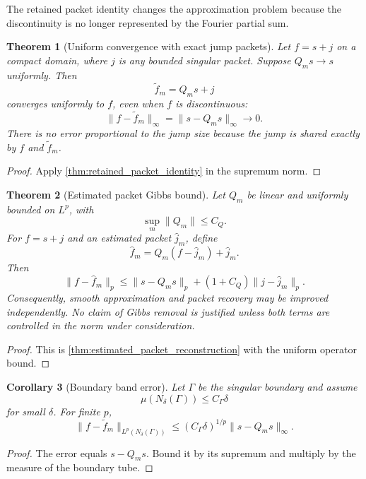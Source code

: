 \documentclass[11pt,a4paper]{article}
\newtheorem{theorem}{Theorem}[section]
\newtheorem{corollary}[theorem]{Corollary}
\theoremstyle{definition}
\theoremstyle{remark}
\begin{document}
The retained packet identity changes the approximation problem because the discontinuity is no longer represented by the Fourier partial sum.

\begin{theorem}[Uniform convergence with exact jump packets]\label{thm:uniform_packet_convergence}
Let \(f=s+j\) on a compact domain, where \(j\) is any bounded singular packet. Suppose \(Q_ms\to s\) uniformly. Then
\[
\widetilde f_m=Q_ms+j
\]
converges uniformly to \(f\), even when \(f\) is discontinuous:
\[
\|f-\widetilde f_m\|_\infty
=
\|s-Q_ms\|_\infty
\longrightarrow0.
\]
There is no error proportional to the jump size because the jump is shared exactly by \(f\) and \(\widetilde f_m\).
\end{theorem}

\begin{proof}
Apply \cref{thm:retained_packet_identity} in the supremum norm.
\end{proof}

\begin{theorem}[Estimated packet Gibbs bound]\label{thm:estimated_packet_gibbs}
Let \(Q_m\) be linear and uniformly bounded on \(L^p\), with
\[
\sup_m\|Q_m\|\leq C_Q.
\]
For \(f=s+j\) and an estimated packet \(\widehat j_m\), define
\[
\widehat f_m
=Q_m(f-\widehat j_m)+\widehat j_m.
\]
Then
\[
\|f-\widehat f_m\|_p
\leq
\|s-Q_ms\|_p
+(1+C_Q)\|j-\widehat j_m\|_p.
\]
Consequently, smooth approximation and packet recovery may be improved independently. No claim of Gibbs removal is justified unless both terms are controlled in the norm under consideration.
\end{theorem}

\begin{proof}
This is \cref{thm:estimated_packet_reconstruction} with the uniform operator bound.
\end{proof}

\begin{corollary}[Boundary band error]\label{cor:boundary_band_error}
Let \(\Gamma\) be the singular boundary and assume
\[
\mu(N_\delta(\Gamma))\leq C_\Gamma\delta
\]
for small \(\delta\). For finite \(p\),
\[
\|f-\widetilde f_m\|_{L^p(N_\delta(\Gamma))}
\leq
(C_\Gamma\delta)^{1/p}
\|s-Q_ms\|_\infty.
\]
\end{corollary}

\begin{proof}
The error equals \(s-Q_ms\). Bound it by its supremum and multiply by the measure of the boundary tube.
\end{proof}
\end{document}
